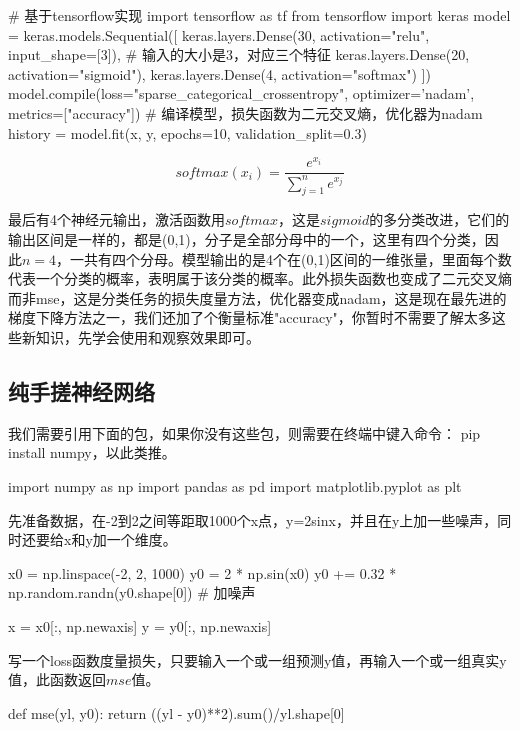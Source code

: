 \documentclass[a5paper, 11pt, openany]{book}
\begin{document}
\newpage

\begin{python}
# 基于tensorflow实现
import tensorflow as tf
from tensorflow import keras
model = keras.models.Sequential([
    keras.layers.Dense(30, activation="relu", input_shape=[3]),
    # 输入的大小是3，对应三个特征
    keras.layers.Dense(20, activation="sigmoid"),
    keras.layers.Dense(4, activation="softmax")
])
model.compile(loss="sparse_categorical_crossentropy", optimizer='nadam', metrics=["accuracy"])
# 编译模型，损失函数为二元交叉熵，优化器为nadam
history = model.fit(x, y, epochs=10,
                    validation_split=0.3)
\end{python}

\begin{equation}
    softmax(x_i) = \frac{e^{x_i}}{\sum^{n}_{j=1}{e^{x_j}}}
\end{equation}

最后有4个神经元输出，激活函数用$softmax$，这是$sigmoid$的多分类改进，它们的输出区间是一样的，都是(0,1)，分子是全部分母中的一个，这里有四个分类，因此$n=4$，一共有四个分母。模型输出的是4个在(0,1)区间的一维张量，里面每个数代表一个分类的概率，表明属于该分类的概率。此外损失函数也变成了二元交叉熵而非mse，这是分类任务的损失度量方法，优化器变成nadam，这是现在最先进的梯度下降方法之一，我们还加了个衡量标准"accuracy"，你暂时不需要了解太多这些新知识，先学会使用和观察效果即可。

\subsection{纯手搓神经网络}

我们需要引用下面的包，如果你没有这些包，则需要在终端中键入命令：
pip install numpy，以此类推。
\begin{python}
import numpy as np
import pandas as pd
import matplotlib.pyplot as plt
\end{python}

先准备数据，在-2到2之间等距取1000个x点，y=2sinx，并且在y上加一些噪声，同时还要给x和y加一个维度。
\begin{python}
x0 = np.linspace(-2, 2, 1000)
y0 = 2 * np.sin(x0)
y0 += 0.32 * np.random.randn(y0.shape[0]) # 加噪声

x = x0[:, np.newaxis]
y = y0[:, np.newaxis]
\end{python}

写一个loss函数度量损失，只要输入一个或一组预测y值，再输入一个或一组真实y值，此函数返回$mse$值。

\begin{python}
def mse(yl, y0):
    return ((yl - y0)**2).sum()/yl.shape[0]
\end{python}
\end{document}
